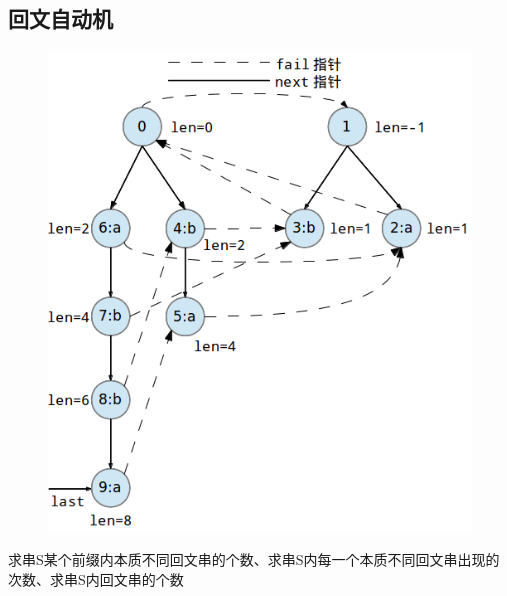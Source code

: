 \documentclass[UTF8,a4paper,titlepage]{ctexart}
\begin{document}
\subsection{回文自动机}
\begin{figure}[h!]
	\centering
	\includegraphics[scale=0.6]{images/Palin.png}
	\label{fig:Palin}
\end{figure}
求串S某个前缀内本质不同回文串的个数、求串S内每一个本质不同回文串出现的次数、求串S内回文串的个数
\end{document}
